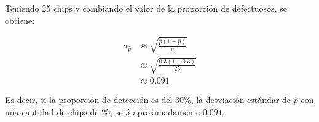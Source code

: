 \documentclass[12pt]{article}\usepackage[]{graphicx}\usepackage[]{xcolor}
\begin{document}
Teniendo 25 chips y cambiando el valor de la proporción de defectuosos, se obtiene:

\begin{align*}
  \sigma_{\hat{p}} &\approx \sqrt{\frac{\hat{p}(1 - \hat{p}) }{n}} \\
                   &\approx   \sqrt{\frac{0.3(1 - 0.3) }{25}} \\
  &\approx 0.091
\end{align*}

Es decir, si la proporción de detección es del 30\%, la desviación estándar de $\hat{p}$ con una cantidad de chips de 25, será aproximadamente $0.091$,
\end{document}
